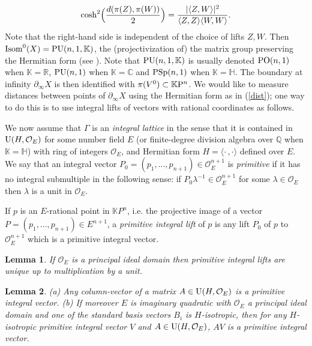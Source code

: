 \documentclass{article}[12pt]
\newcommand{\C}{\mathbb{C}}
\newcommand{\R}{\mathbb{R}}
\newcommand{\Q}{\mathbb{Q}}
\newcommand{\K}{\mathbb{K}}
\newcommand{\quat}{\mathbb{H}}
\newtheorem{lem}{Lemma}%
\begin{document}
\begin{equation}\label{dist}
  \cosh ^2 \Bigl(\frac{d(\pi(Z),\pi(W))}{2}\Bigr) = \frac{|\langle Z, W \rangle|^2}{\langle Z, Z \rangle  \langle W, W \rangle}.
\end{equation}
Note that the right-hand side is independent of the choice of lifts $Z,W$. Then ${\rm Isom}^0(X)={\rm PU}(n,1,\K)$, the (projectivization of) the matrix group preserving the Hermitian form (see \cite{CG}). Note that  ${\rm PU}(n,1,\K)$ is usually denoted ${\rm PO}(n,1)$ when $\K=\R$, ${\rm PU}(n,1)$ when $\K=\C$ and ${\rm PSp}(n,1)$ when $\K=\quat$. The boundary at infinity $\partial_\infty X$ is then identified with  $\pi(V^0) \subset \K{\rm P}^n$. We would like to measure distances between points of $\partial_\infty X$ using the Hermitian form as in (\ref{dist}); one way to do this is to use integral lifts of vectors with rational coordinates as follows.

We now assume that $\Gamma$ is an \emph{integral lattice} in the sense that it is contained in ${\rm U}(H,\mathcal{O}_E)$ for some number field $E$ (or finite-degree division algebra over $\Q$ when $\K=\quat$) with ring of integers $\mathcal{O}_E$, and Hermitian form $H=\langle \cdot \, , \cdot \rangle$ defined over $E$. 
We say that an integral vector $P_0=(p_1,...,p_{n+1}) \in \mathcal{O}_E^{n+1}$ is \emph{primitive} if it has no integral submultiple in the following sense: if $P_0 \lambda ^{-1}\in \mathcal{O}_E^{n+1}$ for some $\lambda \in \mathcal{O}_E$ then $\lambda$ is a unit in $\mathcal{O}_E$.

If $p$ is an $E$-rational point in $\K P^{n}$, i.e. the projective image of a vector $P=(p_1,...,p_{n+1}) \in E^{n+1}$, a \emph{primitive integral lift} of $p$ is any lift $P_0$ of $p$ to $\mathcal{O}_E^{n+1}$ which is a primitive integral vector.


\begin{lem}\label{uniquelift} If $\mathcal{O}_E$ is a principal ideal domain then primitive integral lifts are unique up to multiplication by a unit.
\end{lem}

\begin{lem}\label{primitivecolumn} (a) Any column-vector of a matrix $A \in {\rm U}(H,\mathcal{O}_E)$ is a primitive integral vector. (b)  If moreover $E$ is imaginary quadratic with $\mathcal{O}_E$ a principal ideal domain and one of the standard basis vectors $B_i$ is $H$-isotropic, then for any $H$-isotropic primitive integral vector $V$ and $A \in {\rm U}(H,\mathcal{O}_E)$, $AV$ is a primitive integral vector.
\end{lem}
\end{document}
